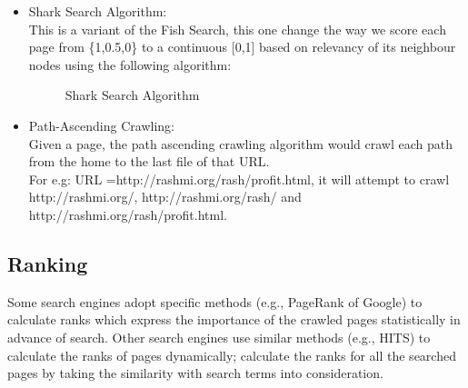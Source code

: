 \documentclass[12pt, a4paper]{report}
\begin{document}
\begin{itemize}
        

    \item Shark Search Algorithm:\\
        This is a variant of the Fish Search, this one change the way we score each page from \{1,0.5,0\} to a continuous [0,1] based on relevancy of its neighbour nodes using the following algorithm:\\
        \begin{figure}[H]
           \begin{center}
            \caption{Shark Search Algorithm}
\label{fig:shark_search}
\end{center}
        \end{figure}

    \item Path-Ascending Crawling:\\
        Given a page, the path ascending crawling algorithm would crawl each path from the home to the last file of that URL.\\
        For e.g: URL =http://rashmi.org/rash/profit.html, it will attempt to crawl http://rashmi.org/, http://rashmi.org/rash/ and http://rashmi.org/rash/profit.html.

\end{itemize}

\subsection{Ranking}
Some search engines adopt specific methods (e.g., PageRank of Google) to calculate ranks which express the importance of the crawled pages statistically in advance of search. Other search engines use similar methods (e.g., HITS) to calculate the ranks of pages dynamically; calculate the ranks for all the searched pages by
taking the similarity with search terms into consideration.
\end{document}
